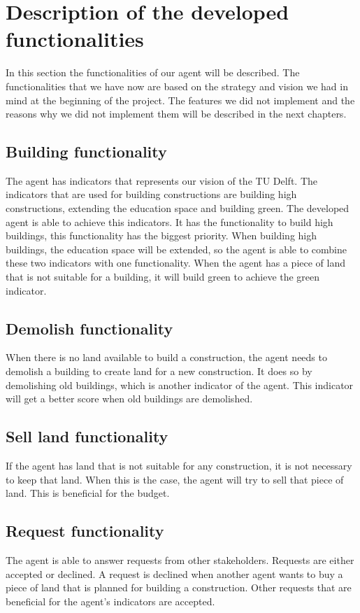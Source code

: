 \section{Description of the developed functionalities}
In this section the functionalities of our agent will be described. The functionalities that we have now are based on the strategy and vision we had in mind at the beginning of the project. The features we did not implement and the reasons why we did not implement them will be described in the next chapters. 

\subsection{Building functionality}
The agent has indicators that represents our vision of the TU Delft. The indicators that are used for building constructions are building high constructions, extending the education space and building green. The developed agent is able to achieve this indicators. It has the functionality to build high buildings, this functionality has the biggest priority. When building high buildings, the education space will be extended, so the agent is able to combine these two indicators with one functionality. When the agent has a piece of land that is not suitable for a building, it will build green to achieve the green indicator.

\subsection{Demolish functionality}
When there is no land available to build a construction, the agent needs to demolish a building to create land for a new construction. It does so by demolishing old buildings, which is another indicator of the agent. This indicator will get a better score when old buildings are demolished.

\subsection{Sell land functionality}
If the agent has land that is not suitable for any construction, it is not necessary to keep that land. When this is the case, the agent will try to sell that piece of land. This is beneficial for the budget.

\subsection{Request functionality}
The agent is able to answer requests from other stakeholders. Requests are either accepted or declined. A request is declined when another agent wants to buy a piece of land that is planned for building a construction. Other requests that are beneficial for the agent’s indicators are accepted.
